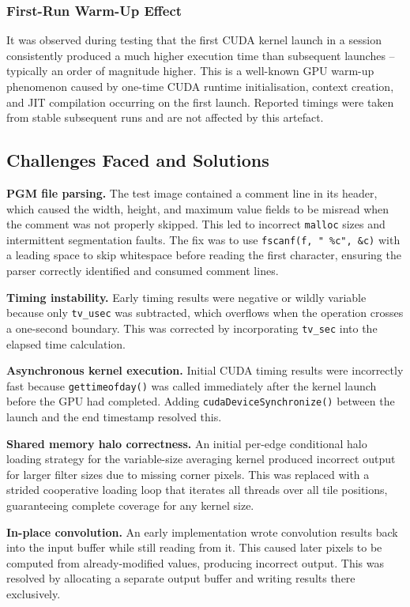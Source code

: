 \subsubsection{First-Run Warm-Up Effect}

It was observed during testing that the first CUDA kernel launch in a session consistently produced a much higher execution time than subsequent launches -- typically an order of magnitude higher. This is a well-known GPU warm-up phenomenon caused by one-time CUDA runtime initialisation, context creation, and JIT compilation occurring on the first launch. Reported timings were taken from stable subsequent runs and are not affected by this artefact.

\subsection{Challenges Faced and Solutions}

\textbf{PGM file parsing.} The test image contained a comment line in its header, which caused the width, height, and maximum value fields to be misread when the comment was not properly skipped. This led to incorrect \texttt{malloc} sizes and intermittent segmentation faults. The fix was to use \texttt{fscanf(f, " \%c", \&c)} with a leading space to skip whitespace before reading the first character, ensuring the parser correctly identified and consumed comment lines.

\textbf{Timing instability.} Early timing results were negative or wildly variable because only \texttt{tv\_usec} was subtracted, which overflows when the operation crosses a one-second boundary. This was corrected by incorporating \texttt{tv\_sec} into the elapsed time calculation.

\textbf{Asynchronous kernel execution.} Initial CUDA timing results were incorrectly fast because \texttt{gettimeofday()} was called immediately after the kernel launch before the GPU had completed. Adding \texttt{cudaDeviceSynchronize()} between the launch and the end timestamp resolved this.

\textbf{Shared memory halo correctness.} An initial per-edge conditional halo loading strategy for the variable-size averaging kernel produced incorrect output for larger filter sizes due to missing corner pixels. This was replaced with a strided cooperative loading loop that iterates all threads over all tile positions, guaranteeing complete coverage for any kernel size.

\textbf{In-place convolution.} An early implementation wrote convolution results back into the input buffer while still reading from it. This caused later pixels to be computed from already-modified values, producing incorrect output. This was resolved by allocating a separate output buffer and writing results there exclusively.

